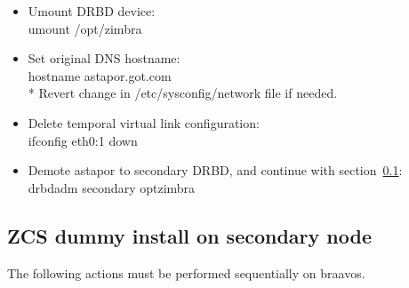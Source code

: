 \documentclass[a4paper, 12pt]{book}
\begin{document}
\begin{itemize}
	\item Umount DRBD device:\\
		umount   /opt/zimbra
	
	\item Set original DNS hostname:\\
		hostname astapor.got.com\\
		* Revert change in /etc/sysconfig/network file if needed.
	
	\item Delete temporal virtual link configuration:\\
		ifconfig eth0:1 down
	
	\item Demote astapor to secondary DRBD, and continue with section~\ref{sec:dummyinstall}:\\
		drbdadm secondary optzimbra
		
\end{itemize}


\subsection{ZCS dummy install on secondary node}
\label{sec:dummyinstall}

\noindent The following actions must be performed sequentially on braavos.
\end{document}
